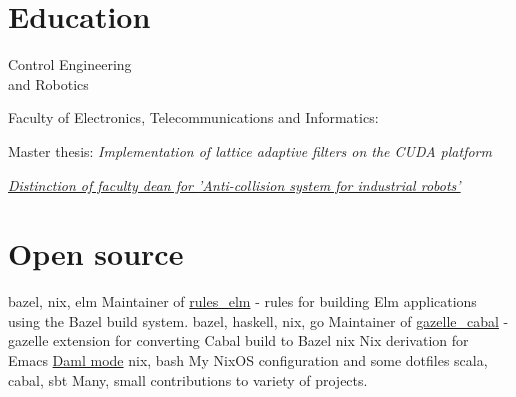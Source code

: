 \documentclass[a4paper,11pt]{cv4tw}%
\begin{document}
\section{Education}
      {Control Engineering\\and Robotics}
      {Faculty of Electronics, Telecommunications and Informatics:
        \begin{missions}
          \item Master thesis: \textit{Implementation of lattice adaptive filters on the CUDA platform}
          \item \href{https://projektgrupowy.eti.pg.gda.pl/editions/2/projects/496/posters/138}{\emph{Distinction of faculty dean for \itshape 'Anti-collision system for industrial robots'}}
        \end{missions}
      }

\section{Open source}
      {bazel, nix, elm}
      {Maintainer of \href{https://github.com/kczulko/rules\_elm}{rules\_elm} - rules for building Elm applications using the Bazel build system.
      }
      {bazel, haskell, nix, go}
      {Maintainer of \href{https://github.com/tweag/gazelle\_cabal}{gazelle\_cabal} - gazelle extension for converting Cabal build to Bazel
      }
      {nix}
      {Nix derivation for Emacs \href{https://github.com/digital-asset/daml}{Daml mode}
      }
      {nix, bash}
      {My NixOS configuration and some dotfiles
      }
      {scala, cabal, sbt}
      {Many, small contributions to variety of projects.
      }
\end{document}
